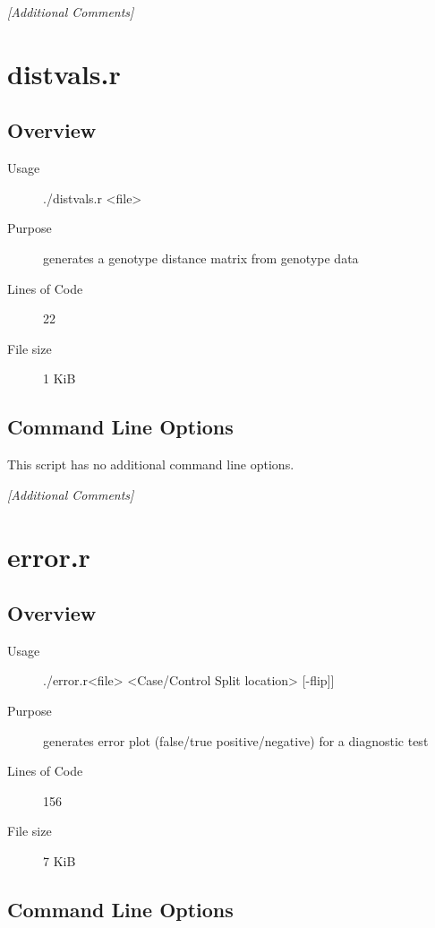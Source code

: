\emph{[Additional Comments]}

\section{distvals.r}
\label{sec:distvals.r}

\subsection{Overview}
\label{sec:distvals.r-overview}

\begin{description}
\item[Usage] ./distvals.r <file>
\item[Purpose] generates a genotype distance matrix from genotype data
\item[Lines of Code] 22
\item[File size] 1 KiB
\end{description}

\subsection{Command Line Options}
\label{sec:distvals.r-command-line}

This script has no additional command line options.

\emph{[Additional Comments]}

\section{error.r}
\label{sec:error.r}

\subsection{Overview}
\label{sec:error.r-overview}

\begin{description}
\item[Usage] ./error.r<file> <Case/Control Split location> [-flip]]
\item[Purpose] generates error plot (false/true positive/negative) for a diagnostic test
\item[Lines of Code] 156
\item[File size] 7 KiB
\end{description}

\subsection{Command Line Options}
\label{sec:error.r-command-line}

